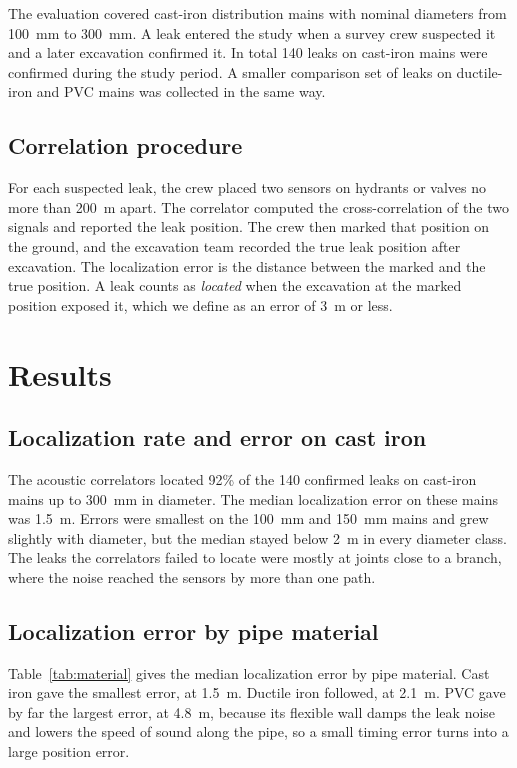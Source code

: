 \documentclass{article}
\begin{document}
The evaluation covered cast-iron distribution mains with nominal diameters from
100~mm to 300~mm. A leak entered the study when a survey crew suspected it and
a later excavation confirmed it. In total 140 leaks on cast-iron mains were
confirmed during the study period. A smaller comparison set of leaks on
ductile-iron and PVC mains was collected in the same way.

\subsection{Correlation procedure}
\label{sec:method-procedure}

For each suspected leak, the crew placed two sensors on hydrants or valves no
more than 200~m apart. The correlator computed the cross-correlation of the two
signals and reported the leak position. The crew then marked that position on
the ground, and the excavation team recorded the true leak position after
excavation. The localization error is the distance between the marked and the
true position. A leak counts as \emph{located} when the excavation at the
marked position exposed it, which we define as an error of 3~m or less.

\section{Results}
\label{sec:results}

\subsection{Localization rate and error on cast iron}
\label{sec:results-castiron}

The acoustic correlators located 92\% of the 140 confirmed leaks on cast-iron
mains up to 300~mm in diameter. The median localization error on these mains
was 1.5~m. Errors were smallest on the 100~mm and 150~mm mains and grew
slightly with diameter, but the median stayed below 2~m in every diameter
class. The leaks the correlators failed to locate were mostly at joints close
to a branch, where the noise reached the sensors by more than one path.

\subsection{Localization error by pipe material}
\label{sec:results-material}

Table~\ref{tab:material} gives the median localization error by pipe material.
Cast iron gave the smallest error, at 1.5~m. Ductile iron followed, at 2.1~m.
PVC gave by far the largest error, at 4.8~m, because its flexible wall damps
the leak noise and lowers the speed of sound along the pipe, so a small timing
error turns into a large position error.
\end{document}
